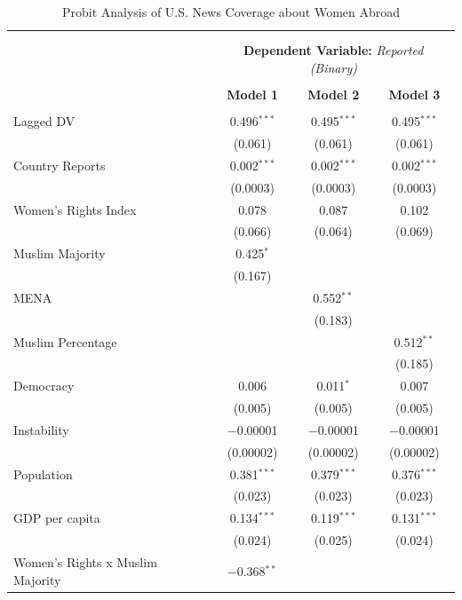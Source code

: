 \documentclass[11pt, oneside]{article}
\begin{document}
\begin{table}[!htbp] \centering 
  \caption{Probit Analysis of U.S. News Coverage about Women Abroad} 
  \label{table:logit} 
\begin{tabular}{@{\extracolsep{5pt}}lccc} 
\\[-1.8ex]\hline \\[-1.8ex] 
\\[-1.8ex] & \multicolumn{3}{c}{\textbf{Dependent Variable:} \emph{Reported (Binary)}} \\
\\[-1.8ex] & \textbf{Model 1} & \textbf{Model 2} & \textbf{Model 3}\\ 
\hline \\[-1.8ex] 
 Lagged DV & 0.496$^{***}$ & 0.495$^{***}$ & 0.495$^{***}$ \\ 
  & (0.061) & (0.061) & (0.061) \\ 
  Country Reports & 0.002$^{***}$ & 0.002$^{***}$ & 0.002$^{***}$ \\ 
  & (0.0003) & (0.0003) & (0.0003) \\ 
  Women's Rights Index & 0.078 & 0.087 & 0.102 \\ 
  & (0.066) & (0.064) & (0.069) \\ 
  Muslim Majority & 0.425$^{*}$ &  &  \\ 
  & (0.167) &  &  \\ 
  MENA &  & 0.552$^{**}$ &  \\ 
  &  & (0.183) &  \\ 
  Muslim Percentage &  &  & 0.512$^{**}$ \\ 
  &  &  & (0.185) \\ 
  Democracy & 0.006 & 0.011$^{*}$ & 0.007 \\ 
  & (0.005) & (0.005) & (0.005) \\ 
  Instability & $-$0.00001 & $-$0.00001 & $-$0.00001 \\ 
  & (0.00002) & (0.00002) & (0.00002) \\ 
  Population & 0.381$^{***}$ & 0.379$^{***}$ & 0.376$^{***}$ \\ 
  & (0.023) & (0.023) & (0.023) \\ 
  GDP per capita & 0.134$^{***}$ & 0.119$^{***}$ & 0.131$^{***}$ \\ 
  & (0.024) & (0.025) & (0.024) \\ 
  Women's Rights x Muslim Majority & $-$0.368$^{**}$ &  &  \\ 

\end{tabular}
\end{table}
\end{document}
